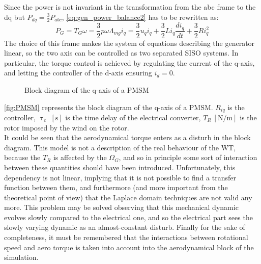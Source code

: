 Since the power is not invariant in the transformation from the abc frame to the dq but $P_{dq} = \frac{3}{2}P_{abc}$, \autoref{eq:gen_power_balance2} has to be rewritten as:
\begin{equation}
  P_G = T_G\omega = \frac{3}{2}p\omega\Lambda_{mg}i_q = \frac{3}{2}u_qi_q + \frac{3}{2}L i_q\frac{di_q}{dt} + \frac{3}{2}R i_q^2
  \label{eq:gen_power_balance3}
\end{equation}
The choice of this frame makes the system of equations describing the generator linear, so the two axis can be controlled as two separated \acrfull{SISO} systems. In particular, the torque control is achieved by regulating the current of the q-axis, and letting the controller of the d-axis ensuring $i_d=0$.
\begin{figure}[htb]

\caption{Block diagram of the q-axis of a PMSM}
\label{fig:PMSM}
\end{figure}

\autoref{fig:PMSM} represents the block diagram of the q-axis of a \acrshort{PMSM}. $R_{iq}$ is the controller, $\uptau_{c}$ $\left[\si{\second}\right]$ is the time delay of the electrical converter, $T_R \ \left[\si{\newton \per \meter}\right]$ is the rotor imposed by the wind on the rotor.\\
It could be seen that the aerodynamical torque enters as a disturb in the block diagram. This model is not a description of the real behaviour of the \acrshort{WT}, because the $T_R$ is affected by the $\Omega_G$, and so in principle some sort of interaction between these quantities should have been introduced. Unfortunately, this dependency is not linear, implying that it is not possible to find a transfer function between them, and furthermore (and more important from the theoretical point of view) that the Laplace domain techniques are not valid any more. This problem may be solved observing that this mechanical dynamic evolves slowly compared to the electrical one, and so the electrical part sees the slowly varying dynamic as an almost-constant disturb. Finally for the sake of completeness, it must be remembered that the interactions between rotational speed and aero torque is taken into account into the aerodynamical block of the simulation.

